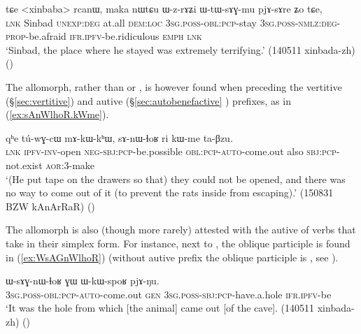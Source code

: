 \begin{exe}
\ex \label{ex:WzrAZi}
\gll tɕe <xinbaba> rcanɯ, maka nɯtɕu ɯ-z-rɤʑi ɯ-tɯ-sɤɣ-mu pjɤ-sɤre ʑo tɕe,\\
\textsc{lnk} Sinbad \textsc{unexp}:\textsc{deg} at.all \textsc{dem}:\textsc{loc} \textsc{3sg}.\textsc{poss}-\textsc{obl}:\textsc{pcp}-stay \textsc{3sg}.\textsc{poss}-\textsc{nmlz}:\textsc{deg}-\textsc{prop}-be.afraid \textsc{ifr}.\textsc{ipfv}-be.ridiculous \textsc{emph} \textsc{lnk}\\
\glt `Sinbad, the place where he stayed was extremely terrifying.' (140511 xinbada-zh)
()
\end{exe}

The  allomorph, rather than  or , is however found when preceding the vertitive (§\ref{sec:vertitive}) and autive (§\ref{sec:autobenefactive} ) prefixes, as in (\ref{ex:sAnWlhoR.kWme}).

\begin{exe}
\ex \label{ex:sAnWlhoR.kWme}
\gll  qʰe tú-wɣ-cɯ mɤ-kɯ-kʰɯ, sɤ-nɯ-ɬoʁ ri kɯ-me ta-βzu. \\
\textsc{lnk} \textsc{ipfv}-\textsc{inv}-open \textsc{neg}-\textsc{sbj}:\textsc{pcp}-be.possible \textsc{obl}:\textsc{pcp}-\textsc{auto}-come.out also \textsc{sbj}:\textsc{pcp}-not.exist \textsc{aor}:3\flobv{}-make \\
\glt `(He put tape on the drawers so that) they could not be opened, and there was no way to come out of it (to prevent the rats inside from escaping).' (150831 BZW kAnArRaR)
()
\end{exe}

The allomorph  is also (though more rarely) attested with the autive  of verbs that take  in their simplex form. For instance, next to , the oblique participle  is found in (\ref{ex:WsAGnWlhoR}) (without autive prefix the oblique participle is , see ).

\begin{exe}
\ex \label{ex:WsAGnWlhoR}
\gll ɯ-sɤɣ-nɯ-ɬoʁ ɣɯ ɯ-kɯ-spoʁ pjɤ-ŋu.  \\
\textsc{3sg}.\textsc{poss}-\textsc{obl}:\textsc{pcp}-\textsc{auto}-come.out \textsc{gen} \textsc{3sg}.\textsc{poss}-\textsc{sbj}:\textsc{pcp}-have.a.hole \textsc{ifr}.\textsc{ipfv}-be \\
\glt `It was the hole from which [the animal] came out [of the cave].  (140511 xinbada-zh) ()
\end{exe} 

